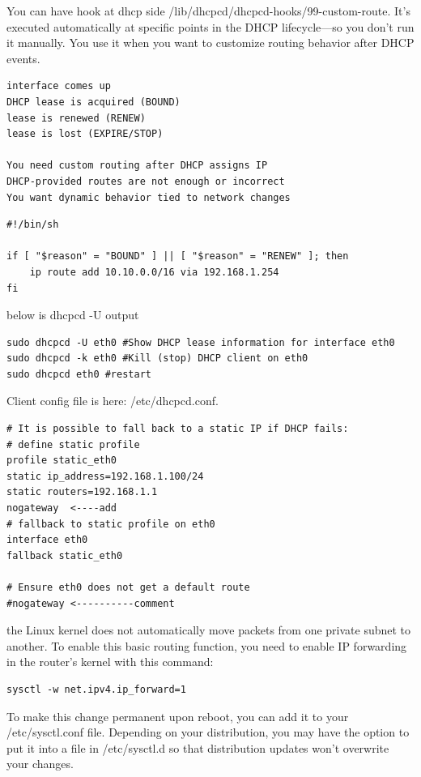 \documentclass[paper=8.5in:11in, twoside, 12pt, pagesize=pdftex]{book}
\begin{document}
	\par  You can have hook at dhcp side /lib/dhcpcd/dhcpcd-hooks/99-custom-route. It’s executed automatically at specific points in the DHCP lifecycle—so you don’t run it manually. You use it when you want to customize routing behavior after DHCP events.
\begin{lstlisting}
interface comes up
DHCP lease is acquired (BOUND)
lease is renewed (RENEW)
lease is lost (EXPIRE/STOP)

You need custom routing after DHCP assigns IP
DHCP-provided routes are not enough or incorrect
You want dynamic behavior tied to network changes
\end{lstlisting}

\begin{lstlisting}
#!/bin/sh

if [ "$reason" = "BOUND" ] || [ "$reason" = "RENEW" ]; then
    ip route add 10.10.0.0/16 via 192.168.1.254
fi
\end{lstlisting}
	

	\par below is dhcpcd -U output
\begin{lstlisting}
sudo dhcpcd -U eth0 #Show DHCP lease information for interface eth0
sudo dhcpcd -k eth0 #Kill (stop) DHCP client on eth0
sudo dhcpcd eth0 #restart 
\end{lstlisting}

	\par Client config file is here: /etc/dhcpcd.conf.
\begin{lstlisting}
# It is possible to fall back to a static IP if DHCP fails:
# define static profile
profile static_eth0
static ip_address=192.168.1.100/24
static routers=192.168.1.1
nogateway  <----add 
# fallback to static profile on eth0
interface eth0
fallback static_eth0

# Ensure eth0 does not get a default route
#nogateway <----------comment
\end{lstlisting}


	\par the Linux kernel does not automatically move packets from one private subnet to another. To enable this basic routing function, you need to enable IP forwarding in the router’s kernel with this command:
\begin{lstlisting}
sysctl -w net.ipv4.ip_forward=1
\end{lstlisting}

	\par To make this change permanent upon reboot, you can add it to your /etc/sysctl.conf file. Depending on your distribution, you may have the option to put it into a file in /etc/sysctl.d so that distribution updates won’t overwrite your changes.
\end{document}
